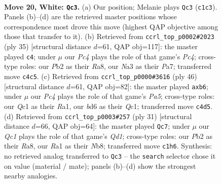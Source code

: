 \documentclass[11pt]{article}
\begin{document}
\clearpage

\begin{figure}[p]\centering
\begin{subfigure}{0.46\textwidth}\centering
\resizebox{\linewidth}{!}{%
\newchessgame
\chessboard[
  setfen={2r1r1k1/pp5p/3bpqp1/3pn3/2P5/N5P1/PP2BP1P/R1Q1R1K1 w - - 3 20},
  showmover=false,
  pgfstyle=straightmove, color=movearrow, markmove={c1-c3}
]}
\caption{}
\end{subfigure}\hfill
\begin{subfigure}{0.46\textwidth}\centering
\resizebox{\linewidth}{!}{%
\newchessgame
\chessboard[
  setfen={r2r2k1/pb1n1pp1/3q3p/2pp4/QP6/P1R1PN1P/4BPP1/3R2K1 b - - 0 18},
  showmover=false,
  pgfstyle=straightmove, color=movearrow, markmove={c5-c4}
]}
\caption{}
\end{subfigure}
\\[4pt]
\begin{subfigure}{0.46\textwidth}\centering
\resizebox{\linewidth}{!}{%
\newchessgame
\chessboard[
  setfen={1r1qn1k1/p4ppp/1p6/PbpPr3/8/1P4P1/1N3PBP/R1QR2K1 w - - 1 24},
  showmover=false,
  pgfstyle=straightmove, color=movearrow, markmove={a5-b6}
]}
\caption{}
\end{subfigure}\hfill
\begin{subfigure}{0.46\textwidth}\centering
\resizebox{\linewidth}{!}{%
\newchessgame
\chessboard[
  setfen={rn1q1r2/pp2ppk1/6p1/7p/3pb3/2P2NP1/P3PPBP/R1QR2K1 b - - 1 16},
  showmover=false,
  pgfstyle=straightmove, color=movearrow, markmove={d8-c7}
]}
\caption{}
\end{subfigure}
\caption{\textbf{Move 20, White: \texttt{Qc3}.} (a) Our position; Melanie plays \texttt{Qc3} (\texttt{c1c3}). Panels (b)--(d) are the retrieved master positions whose correspondence most drove this move (highest QAP objective among those that transfer to it). (b) Retrieved from \texttt{ccrl\_top\_p0002\#2023} (ply 35) [structural distance $d$=61, QAP obj=117]: the master played \texttt{c4}; under $\mu$ our \emph{Pc4} plays the role of that game's \emph{Pc4}; cross-type roles: our \emph{P}b2 as their \emph{R}a8, our \emph{N}a3 as their \emph{P}a7; transferred move \texttt{c4c5}. (c) Retrieved from \texttt{ccrl\_top\_p0000\#3616} (ply 46) [structural distance $d$=61, QAP obj=82]: the master played \texttt{axb6}; under $\mu$ our \emph{Pc4} plays the role of that game's \emph{Pa5}; cross-type roles: our \emph{Q}c1 as their \emph{R}a1, our \emph{b}d6 as their \emph{Q}c1; transferred move \texttt{c4d5}. (d) Retrieved from \texttt{ccrl\_top\_p0003\#257} (ply 31) [structural distance $d$=66, QAP obj=64]: the master played \texttt{Qc7}; under $\mu$ our \emph{Qc1} plays the role of that game's \emph{Qd1}; cross-type roles: our \emph{P}b2 as their \emph{R}a8, our \emph{R}a1 as their \emph{N}b8; transferred move \texttt{c1h6}. Synthesis: no retrieved analog transferred to \texttt{Qc3} -- the \texttt{search} selector chose it on value (material / mate); panels (b)--(d) show the strongest nearby analogies.}
\label{fig:thought-m38}
\end{figure}
\end{document}
